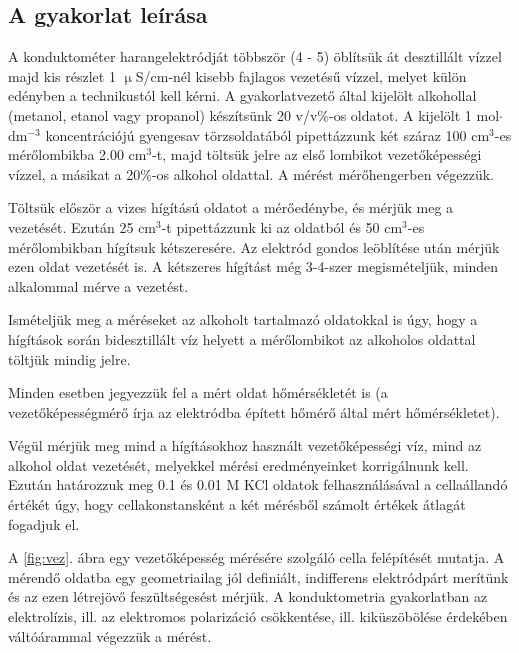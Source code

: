 \subsection{A gyakorlat leírása}

A konduktométer harangelektródját többször (4 - 5) öblítsük át desztillált vízzel majd kis részlet 1 $\upmu$S/cm-nél kisebb fajlagos vezetésű vízzel, melyet külön edényben a technikustól kell kérni.
A gyakorlatvezető által kijelölt alkohollal (metanol, etanol vagy propanol) készítsünk 20 v/v\%-os oldatot.
A kijelölt 1 mol$\cdot$dm$^{-3}$ koncentrációjú gyengesav törzsoldatából pipettázzunk két száraz 100 cm$^3$-es mérőlombikba 2.00 cm$^3$-t, majd töltsük jelre az első lombikot vezetőképességi vízzel, a másikat a 20\%-os alkohol oldattal.
A mérést mérőhengerben végezzük.

Töltsük először a vizes hígítású oldatot a mérőedénybe, és mérjük meg a vezetését.
Ezután 25 cm$^3$-t pipettázzunk ki az oldatból és 50 cm$^3$-es mérőlombikban hígítsuk kétszeresére.
Az elektród gondos leöblítése után mérjük ezen oldat vezetését is.
A kétszeres hígítást még 3-4-szer megismételjük, minden alkalommal mérve a vezetést.

Ismételjük meg a méréseket az alkoholt tartalmazó oldatokkal is úgy, hogy a hígítások során bidesztillált víz helyett a mérőlombikot az alkoholos oldattal töltjük mindig jelre.

Minden esetben jegyezzük fel a mért oldat hőmérsékletét is (a vezetőképességmérő írja az elektródba épített hőmérő által mért hőmérsékletet).

Végül mérjük meg mind a hígításokhoz használt vezetőképességi víz, mind az alkohol oldat vezetését, melyekkel mérési eredményeinket korrigálnunk kell.
Ezután határozzuk meg 0.1 és 0.01 M KCl oldatok felhasználásával a cellaállandó értékét úgy, hogy cellakonstansként a két mérésből számolt értékek átlagát fogadjuk el.

A \ref{fig:vez}. ábra egy vezetőképesség mérésére szolgáló cella felépítését mutatja.
A mérendő oldatba egy geometriailag jól definiált, indifferens elektródpárt merítünk és az ezen létrejövő feszültségesést mérjük.
A konduktometria gyakorlatban az elektrolízis, ill. az elektromos polarizáció csökkentése, ill. kiküszöbölése érdekében váltóárammal végezzük a mérést.

